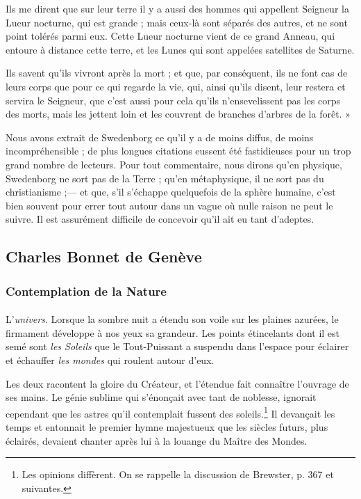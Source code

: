 \documentclass[a4paper, 11pt, oneside]{article}
\begin{document}
Ils me dirent que sur leur terre il y a aussi des hommes qui appellent Seigneur la Lueur nocturne, qui est grande ; mais ceux-là sont séparés des autres, et ne sont point tolérés parmi eux. Cette Lueur nocturne vient de ce grand Anneau, qui entoure à distance cette terre, et les Lunes qui sont appelées satellites de Saturne.

Ils savent qu'ils vivront après la mort ; et que, par conséquent, ils ne font cas de leurs corps que pour ce qui regarde la vie, qui, ainsi qu'ils disent, leur restera et servira le Seigneur, que c'est aussi pour cela qu'ils n'ensevelissent pas les corps des morts, mais les jettent loin et les couvrent de branches d'arbres de la forêt. »

Nous avons extrait de Swedenborg ce qu'il y a de moins diffus, de moins incompréhensible ; de plus longues citations eussent été fastidieuses pour un trop grand nombre de lecteurs. Pour tout commentaire, nous dirons qu'en physique, Swedenborg ne sort pas de la Terre ; qu'en métaphysique, il ne sort pas du christianisme ;--- et que, s'il s'échappe quelquefois de la sphère humaine, c'est bien souvent pour errer tout autour dans un vague où nulle raison ne peut le suivre. Il est assurément difficile de concevoir qu'il ait eu tant d'adeptes.
\clearpage
\subsection{Charles Bonnet de Genève}
\subsubsection{Contemplation de la Nature}
\paragraph{}
L'\emph{univers}. Lorsque la sombre nuit a étendu son voile sur les plaines azurées, le firmament développe à nos yeux sa grandeur. Les points étincelants dont il est semé sont \emph{les Soleils} que le Tout-Puissant a suspendu dans l'espace pour éclairer et échauffer \emph{les mondes} qui roulent autour d'eux.

Les deux racontent la gloire du Créateur, et l'étendue fait connaître l'ouvrage de ses mains. Le génie sublime qui s'énonçait avec tant de noblesse, ignorait cependant que les astres qu'il contemplait fussent des soleils.\footnote{Les opinions diffèrent. On se rappelle la discussion de Brewster, p. 367 et suivantes.} Il devançait les temps et entonnait le premier hymne majestueux que les siècles futurs, plus éclairés, devaient chanter après lui à la louange du Maître des Mondes.
\end{document}
